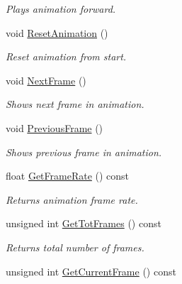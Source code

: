 \begin{DoxyCompactItemize}
\begin{DoxyCompactList}\small\item\em Plays animation forward. \end{DoxyCompactList}\item 
void \hyperlink{class_b_v_h_scene_ad41ce515baef5d75819a228bf394aa2a}{Reset\+Animation} ()\hypertarget{class_b_v_h_scene_ad41ce515baef5d75819a228bf394aa2a}{}\label{class_b_v_h_scene_ad41ce515baef5d75819a228bf394aa2a}

\begin{DoxyCompactList}\small\item\em Reset animation from start. \end{DoxyCompactList}\item 
void \hyperlink{class_b_v_h_scene_a564f9d05ae59bcbf826294a6e3aa1240}{Next\+Frame} ()\hypertarget{class_b_v_h_scene_a564f9d05ae59bcbf826294a6e3aa1240}{}\label{class_b_v_h_scene_a564f9d05ae59bcbf826294a6e3aa1240}

\begin{DoxyCompactList}\small\item\em Shows next frame in animation. \end{DoxyCompactList}\item 
void \hyperlink{class_b_v_h_scene_a4e60ddbede691cfee5efe3fa6001936b}{Previous\+Frame} ()\hypertarget{class_b_v_h_scene_a4e60ddbede691cfee5efe3fa6001936b}{}\label{class_b_v_h_scene_a4e60ddbede691cfee5efe3fa6001936b}

\begin{DoxyCompactList}\small\item\em Shows previous frame in animation. \end{DoxyCompactList}\item 
float \hyperlink{class_b_v_h_scene_a0c771b1231d748914d926b6c97a2b803}{Get\+Frame\+Rate} () const\hypertarget{class_b_v_h_scene_a0c771b1231d748914d926b6c97a2b803}{}\label{class_b_v_h_scene_a0c771b1231d748914d926b6c97a2b803}

\begin{DoxyCompactList}\small\item\em Returns animation frame rate. \end{DoxyCompactList}\item 
unsigned int \hyperlink{class_b_v_h_scene_aa676bf99ee729af78c743f11bbcb3511}{Get\+Tot\+Frames} () const\hypertarget{class_b_v_h_scene_aa676bf99ee729af78c743f11bbcb3511}{}\label{class_b_v_h_scene_aa676bf99ee729af78c743f11bbcb3511}

\begin{DoxyCompactList}\small\item\em Returns total number of frames. \end{DoxyCompactList}\item 
unsigned int \hyperlink{class_b_v_h_scene_a998c310efe018f870af568080c802db2}{Get\+Current\+Frame} () const\hypertarget{class_b_v_h_scene_a998c310efe018f870af568080c802db2}{}\label{class_b_v_h_scene_a998c310efe018f870af568080c802db2}


\end{DoxyCompactItemize}
